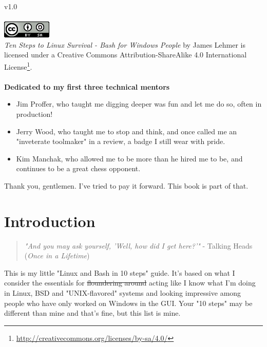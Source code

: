 \documentclass[10pt,american,]{book}
\renewcommand{\href}[2]{#2\footnote{\url{#1}}}
\numberwithin{figure}{chapter}
\begin{document}
 v1.0 ~\\
\hspace*{0.333em}\\
 \includegraphics{./images/cc-by-sa.png}\\
\emph{Ten Steps to Linux Survival - Bash for Windows People} by James
Lehmer is licensed under a
\href{http://creativecommons.org/licenses/by-sa/4.0/}{Creative Commons
Attribution-ShareAlike 4.0 International License}. ~\\
\hspace*{0.333em}\\
 \textbf{Dedicated to my first three technical mentors}

\begin{itemize}
\item
  Jim Proffer, who taught me digging deeper was fun and let me do so,
  often in production!
\item
  Jerry Wood, who taught me to stop and think, and once called me an
  "inveterate toolmaker" in a review, a badge I still wear with pride.
\item
  Kim Manchak, who allowed me to be more than he hired me to be, and
  continues to be a great chess opponent.
\end{itemize}

Thank you, gentlemen. I've tried to pay it forward. This book is part of
that.

\pagestyle{fancy} \fancyhead{}
\fancyhead[RO]{\slshape \leftmark} \renewcommand{\headrulewidth}{0.4pt}

\hypertarget{introduction}{\chapter{Introduction}\label{introduction}}

\begin{quote}
\emph{"And you may ask yourself, 'Well, how did I get here?'"} - Talking
Heads (\emph{Once in a Lifetime})
\end{quote}

This is my little "Linux and Bash in 10 steps" guide. It's based on what
I consider the essentials for \sout{floundering around} acting like I
know what I'm doing in Linux, BSD and "UNIX-flavored" systems and
looking impressive among people who have only worked on Windows in the
GUI. Your "10 steps" may be different than mine and that's fine, but
this list is mine.
\end{document}
